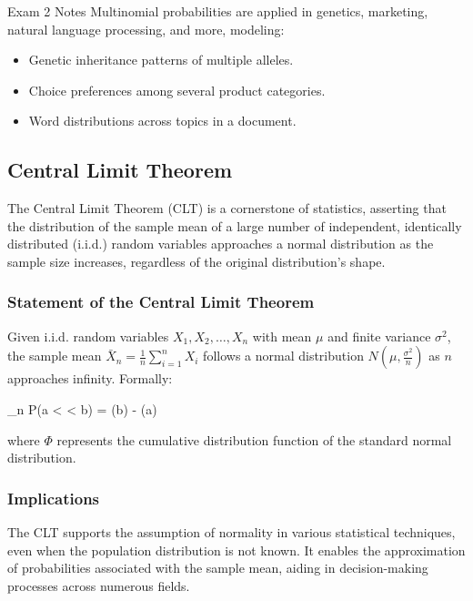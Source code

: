 \begin{examnotes}{Exam 2 Notes}
    Multinomial probabilities are applied in genetics, marketing, natural language processing, and more, modeling:
    \begin{itemize}
        \item Genetic inheritance patterns of multiple alleles.
        \item Choice preferences among several product categories.
        \item Word distributions across topics in a document.
    \end{itemize}

    \subsection*{Central Limit Theorem}

    The Central Limit Theorem (CLT) is a cornerstone of statistics, asserting that the distribution of the sample mean of a large number of independent, identically distributed (i.i.d.) random variables 
    approaches a normal distribution as the sample size increases, regardless of the original distribution's shape.
    
    \subsubsection*{Statement of the Central Limit Theorem}
    
    Given i.i.d. random variables $X_1, X_2, \ldots, X_n$ with mean $\mu$ and finite variance $\sigma^2$, the sample mean $\bar{X}_n = \frac{1}{n}\sum_{i=1}^{n}X_i$ follows a normal distribution 
    $N\left(\mu, \frac{\sigma^2}{n}\right)$ as $n$ approaches infinity. Formally:
    
    \begin{center}
        \begin{highlightbox}
            \lim_{n \to \infty} P\left(a <  < b\right) = \Phi(b) - \Phi(a)
        \end{highlightbox}
    \end{center}
    where $\Phi$ represents the cumulative distribution function of the standard normal distribution.
    
    \subsubsection*{Implications}
    
    The CLT supports the assumption of normality in various statistical techniques, even when the population distribution is not known. It enables the approximation of probabilities associated with 
    the sample mean, aiding in decision-making processes across numerous fields.
    

\end{examnotes}
